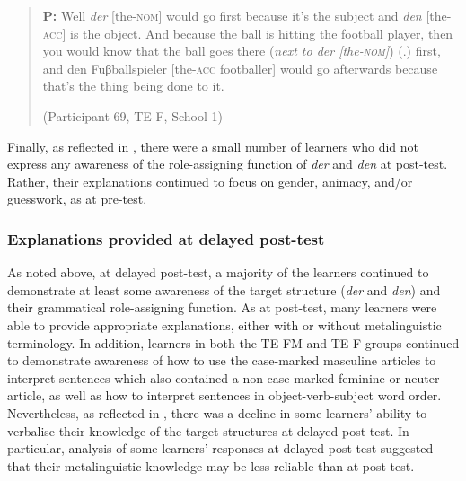 \documentclass[output=paper]{langscibook}
\begin{document}
\begin{quote}
  \textbf{P:} Well \textit{\ul{der}} [the-\textsc{nom}] would go first because it’s the subject   and \textit{\ul{den}} [the-\textsc{acc}] is the object. And because the ball is hitting   the football player, then you would know that the ball goes   there (\textit{next to \ul{der} [the-\textsc{nom}]}) (.) first, and den Fuβballspieler   [the-\textsc{acc} footballer] would go afterwards because that’s the   thing being done to it. 
  
  (Participant 69, TE-F, School 1)
\end{quote}

Finally, as reflected in , there were a small number of learners who did not express any awareness of the role-assigning function of \textit{der} and \textit{den} at post-test. Rather, their explanations continued to focus on gender, animacy, and/or guesswork, as at pre-test.

\subsubsection{Explanations provided at delayed post-test}

As noted above, at delayed post-test, a majority of the learners continued to demonstrate at least some awareness of the target structure (\textit{der} and \textit{den}) and their grammatical role-assigning function. As at post-test, many learners were able to provide appropriate explanations, either with or without metalinguistic terminology. In addition, learners in both the TE-FM and TE-F groups continued to demonstrate awareness of how to use the case-marked masculine articles to interpret sentences which also contained a non-case-marked feminine or neuter article, as well as how to interpret sentences in object-verb-subject word order. Nevertheless, as reflected in , there was a decline in some learners’ ability to verbalise their knowledge of the target structures at delayed post-test. In particular, analysis of some learners’ responses at delayed post-test suggested that their metalinguistic knowledge may be less reliable than at post-test.
\end{document}
